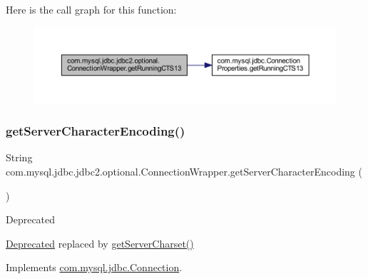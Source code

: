 Here is the call graph for this function\+:
\nopagebreak
\begin{figure}[H]
\begin{center}
\leavevmode
\includegraphics[width=350pt]{classcom_1_1mysql_1_1jdbc_1_1jdbc2_1_1optional_1_1_connection_wrapper_a36c11c49d3f4edb4131bef69c53e8141_cgraph}
\end{center}
\end{figure}
\mbox{\label{classcom_1_1mysql_1_1jdbc_1_1jdbc2_1_1optional_1_1_connection_wrapper_a2426ec0276a9fe98270a545d0c272546}} 
\subsubsection{\texorpdfstring{get\+Server\+Character\+Encoding()}{getServerCharacterEncoding()}}
{\footnotesize\ttfamily String com.\+mysql.\+jdbc.\+jdbc2.\+optional.\+Connection\+Wrapper.\+get\+Server\+Character\+Encoding (\begin{DoxyParamCaption}{ }\end{DoxyParamCaption})}

\begin{DoxyRefDesc}{Deprecated}
\item[\mbox{\hyperlink{deprecated__deprecated000010}{Deprecated}}]replaced by {\ttfamily \mbox{\hyperlink{classcom_1_1mysql_1_1jdbc_1_1jdbc2_1_1optional_1_1_connection_wrapper_a1ef2f18c2e33a44c97b764a50fda2da4}{get\+Server\+Charset()}}} \end{DoxyRefDesc}


Implements \mbox{\hyperlink{interfacecom_1_1mysql_1_1jdbc_1_1_connection_ab6e0170645e189b8622642705f7cc3a4}{com.\+mysql.\+jdbc.\+Connection}}.

